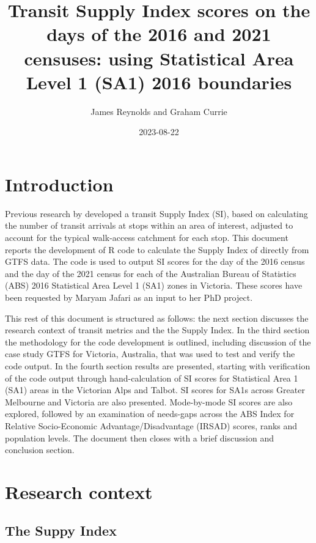 \documentclass[]{tufte-book}
\title[Reynolds and Currie]{Transit Supply Index scores on the days of
the 2016 and 2021 censuses: using Statistical Area Level 1 (SA1) 2016
boundaries}
\author{James Reynolds and Graham Currie}
\date{2023-08-22}
\begin{document}
\maketitle




\hypertarget{introduction}{%
\chapter{Introduction}\label{introduction}}

Previous research by \citet{currie2007identifying} developed a transit
Supply Index (SI), based on calculating the number of transit arrivals
at stops within an area of interest, adjusted to account for the typical
walk-access catchment for each stop. This document reports the
development of R code to calculate the Supply Index of
\citet{currie2007identifying} directly from GTFS data. The code is used
to output SI scores for the day of the 2016 census and the day of the
2021 census for each of the Australian Bureau of Statistics (ABS) 2016
Statistical Area Level 1 (SA1) zones in Victoria. These scores have been
requested by Maryam Jafari as an input to her PhD project.

This rest of this document is structured as follows: the next section
discusses the research context of transit metrics and the the Supply
Index. In the third section the methodology for the code development is
outlined, including discussion of the case study GTFS for Victoria,
Australia, that was used to test and verify the code output. In the
fourth section results are presented, starting with verification of the
code output through hand-calculation of SI scores for Statistical Area 1
(SA1) areas in the Victorian Alps and Talbot. SI scores for SA1s across
Greater Melbourne and Victoria are also presented. Mode-by-mode SI
scores are also explored, followed by an examination of needs-gaps
across the ABS Index for Relative Socio-Economic Advantage/Disadvantage
(IRSAD) scores, ranks and population levels. The document then closes
with a brief discussion and conclusion section.

\hypertarget{research-context}{%
\chapter{Research context}\label{research-context}}

\hypertarget{the-suppy-index}{%
\section{The Suppy Index}\label{the-suppy-index}}
\end{document}
